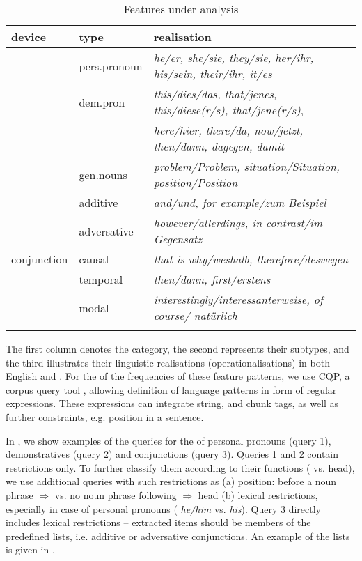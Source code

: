 \documentclass[output=paper]{langsci/langscibook.cls}
\begin{document}
\begin{table}

 
    \begin{tabularx}{\textwidth}{llQ}
    \lsptoprule
{\bf device}&{\bf type} & {\bf realisation}  \\
 
\midrule
& pers.pronoun   &  \textsl{he/er, she/sie, they/sie, her/ihr, his/sein, their/ihr, it/es} \\
\tablevspace
& dem.pron &  \textsl{this/dies/das, that/jenes, this/diese(r/s), that/jene(r/s)},\\
            &         &  \textsl{here/hier, there/da, now/jetzt, then/dann, dagegen, damit}\\
\tablevspace
& gen.nouns &  \textsl{problem/Problem, situation/Situation, position/Position}\\

\midrule 
& additive&  \textsl{and/und, for example/zum Beispiel}\\
\tablevspace
& adversative&  \textsl{however/allerdings, in contrast/im Gegensatz}\\
\tablevspace
conjunction  & causal&  \textsl{that is why/weshalb, therefore/deswegen}\\
\tablevspace
& temporal&  \textsl{then/dann, first/erstens}\\
\tablevspace
& modal&  \textsl{interestingly/interessanterweise, of course/ nat\"urlich}\\
\lspbottomrule
\end{tabularx}
  \caption{Features under analysis}
  \label{Table:features}
\end{table}

The first column denotes the category, the second represents their subtypes, and the third illustrates their linguistic realisations  (operationalisations) in both English and . For the  of the frequencies of these feature patterns, we use CQP, a corpus query tool \citep{Evert2005}, allowing definition of language patterns in form of regular expressions. These expressions can integrate string,  and chunk tags, as well as further constraints, e.g. position in a sentence.
 
In , we show examples of the queries for the  of personal pronouns (query 1), demonstratives (query 2) and conjunctions (query 3). Queries 1 and 2 contain  restrictions only. To further classify them according to their functions ( vs. head), we use additional queries with such restrictions as
\largerpage
(a) position: before a noun phrase $\Rightarrow$  vs. no noun phrase following $\Rightarrow$ head (b) lexical restrictions, especially in case of personal pronouns ( \textsl{he/him} vs.  \textsl{his}). Query 3 directly includes lexical restrictions -- extracted items should be members of the predefined lists, i.e. additive or adversative conjunctions. An example of the lists is given in .
 
\end{document}
